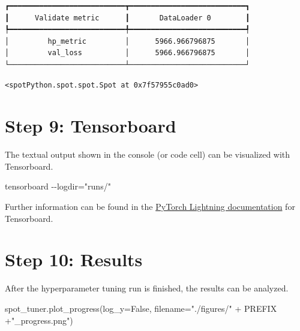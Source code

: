 \documentclass[
  letterpaper,
  DIV=11,
  numbers=noendperiod]{scrreprt}
\newenvironment{Shaded}{\begin{snugshade}}{\end{snugshade}}
\newcommand{\NormalTok}[1]{\textcolor[rgb]{0.00,0.23,0.31}{#1}}
\newcommand{\OperatorTok}[1]{\textcolor[rgb]{0.37,0.37,0.37}{#1}}
\newcommand{\StringTok}[1]{\textcolor[rgb]{0.13,0.47,0.30}{#1}}
\newcommand{\VariableTok}[1]{\textcolor[rgb]{0.07,0.07,0.07}{#1}}
\begin{document}
\begin{verbatim}
┏━━━━━━━━━━━━━━━━━━━━━━━━━━━┳━━━━━━━━━━━━━━━━━━━━━━━━━━━┓
┃      Validate metric      ┃       DataLoader 0        ┃
┡━━━━━━━━━━━━━━━━━━━━━━━━━━━╇━━━━━━━━━━━━━━━━━━━━━━━━━━━┩
│         hp_metric         │      5966.966796875       │
│         val_loss          │      5966.966796875       │
└───────────────────────────┴───────────────────────────┘
\end{verbatim}

\begin{verbatim}
<spotPython.spot.spot.Spot at 0x7f57955c0ad0>
\end{verbatim}

\section{Step 9: Tensorboard}\label{sec-tensorboard-31}

The textual output shown in the console (or code cell) can be visualized
with Tensorboard.

\begin{Shaded}
\begin{Highlighting}[]
\NormalTok{tensorboard {-}{-}logdir="runs/"}
\end{Highlighting}
\end{Shaded}

Further information can be found in the
\href{https://lightning.ai/docs/pytorch/stable/api/lightning.pytorch.loggers.tensorboard.html}{PyTorch
Lightning documentation} for Tensorboard.

\section{Step 10: Results}\label{sec-results-31}

After the hyperparameter tuning run is finished, the results can be
analyzed.

\begin{Shaded}
\begin{Highlighting}[]
\NormalTok{spot\_tuner.plot\_progress(log\_y}\OperatorTok{=}\VariableTok{False}\NormalTok{,}
\NormalTok{    filename}\OperatorTok{=}\StringTok{"./figures/"} \OperatorTok{+}\NormalTok{ PREFIX }\OperatorTok{+}\StringTok{"\_progress.png"}\NormalTok{)}
\end{Highlighting}
\end{Shaded}
\end{document}
